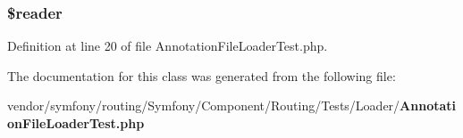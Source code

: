 \subsubsection[{\$reader}]{\setlength{\rightskip}{0pt plus 5cm}\$reader\hspace{0.3cm}{\ttfamily [protected]}}\label{class_symfony_1_1_component_1_1_routing_1_1_tests_1_1_loader_1_1_annotation_file_loader_test_a56ac4227ed0f1f20fd1d31918f3bd2ff}


Definition at line 20 of file Annotation\+File\+Loader\+Test.\+php.



The documentation for this class was generated from the following file\+:\begin{DoxyCompactItemize}
\item 
vendor/symfony/routing/\+Symfony/\+Component/\+Routing/\+Tests/\+Loader/{\bf Annotation\+File\+Loader\+Test.\+php}\end{DoxyCompactItemize}
